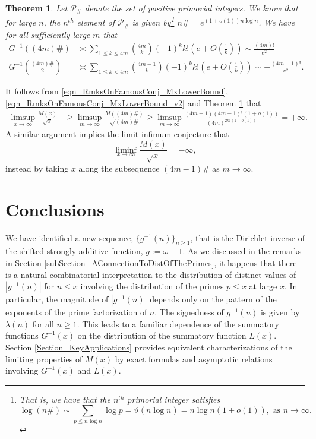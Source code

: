 \documentclass[11pt,reqno,a4letter]{article}
\numberwithin{figure}{section}
\numberwithin{table}{section}
\theoremstyle{plain}
\newtheorem{theorem}{Theorem}
\numberwithin{theorem}{section}
\theoremstyle{definition}
\begin{document}
\begin{theorem}
\label{theorem_PrimorialSeqGInvCalcs_v1} 
Let $\mathcal{P}_{\#}$ denote the set of positive primorial integers. 
We know that for large $n$, the $n^{th}$ element of $\mathcal{P}_{\#}$ is 
given by\footnote{
     That is, we have that the $n^{th}$ primorial integer satisfies 
     \cite[\S 4.3]{APOSTOLANUMT} 
     \[
     \log(n\#) \sim \sum_{p \leq n\log n} \log p = \vartheta(n\log n) = 
          n\log n (1+o(1)), 
          \text{ as } n \rightarrow \infty.           
     \]
} $n\# = e^{(1+o(1)) n \log n}$. 
We have for all sufficiently large $m$ that 
\begin{align*}
G^{-1}((4m)\#) & \asymp \sum_{1 \leq k \leq 4m} \binom{4m}{k} (-1)^{k} k! 
     \left(e + O\left(\frac{1}{k}\right)\right) \sim \frac{(4m)!}{e^2} \\ 
G^{-1}\left(\frac{(4m)\#}{2}\right) & \asymp \sum_{1 \leq k < 4m} \binom{4m-1}{k} (-1)^{k} k! 
     \left(e + O\left(\frac{1}{k}\right)\right) \sim -\frac{(4m-1)!}{e^2}. 
\end{align*} 
\end{theorem}

It follows from \eqref{eqn_RmksOnFamousConj_MxLowerBound}, 
\eqref{eqn_RmksOnFamousConj_MxLowerBound_v2} and 
Theorem \ref{theorem_PrimorialSeqGInvCalcs_v1} that 
\begin{align*}
\limsup_{x \rightarrow \infty} \frac{M(x)}{\sqrt{x}} & \geq \limsup_{m \rightarrow \infty} 
     \frac{M((4m)\#)}{\sqrt{(4m)\#}} \geq \limsup_{m \rightarrow \infty} 
     \frac{(4m-1) (4m-1)! (1+o(1))}{(4m)^{2m(1+o(1))}} = +\infty. 
\end{align*}
A similar argument implies the limit infimum conjecture that 
\[
\liminf_{x \rightarrow \infty} \frac{M(x)}{\sqrt{x}} = -\infty, 
\]
instead by taking $x$ along the subsequence $(4m-1)\#$ as $m \rightarrow \infty$. 

\newpage
\section{Conclusions}

We have identified a new sequence, 
$\{g^{-1}(n)\}_{n \geq 1}$, that is the Dirichlet inverse of the 
shifted strongly additive function, $g := \omega + 1$. 
As we discussed in the remarks in 
Section \ref{subSection_AConnectionToDistOfThePrimes}, 
it happens that there is a natural combinatorial interpretation to the 
distribution of distinct values 
of $|g^{-1}(n)|$ for $n \leq x$ involving the distribution of the 
primes $p \leq x$ at large $x$. 
In particular, the magnitude of $|g^{-1}(n)|$ depends only on the pattern of 
the exponents of the prime factorization of $n$. 
The signedness of $g^{-1}(n)$ is given by $\lambda(n)$ for all $n \geq 1$. 
This leads to a familiar dependence of the 
summatory functions $G^{-1}(x)$ on the distribution of the summatory function $L(x)$. 
Section \ref{Section_KeyApplications} 
provides equivalent characterizations of the limiting properties of 
$M(x)$ by exact formulas and asymptotic relations involving 
$G^{-1}(x)$ and $L(x)$. 
\end{document}
